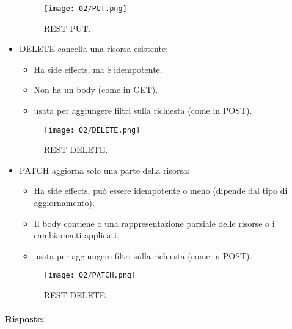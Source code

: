 \begin{itemize}
\begin{itemize}
	      \end{itemize}

	      \begin{figure}[h]
		      \centering
		      \texttt{[image: 02/PUT.png]}
		      \caption{REST PUT.}
	      \end{figure}

	\item DELETE cancella una risorsa esistente:
	      \begin{itemize}
		      \item Ha side effects, ma è idempotente.
		      \item Non ha un body (come in GET).
		      \item {} usata per aggiungere filtri sulla richiesta (come in POST).

	      \end{itemize}
	       \begin{figure}[h]
		      \centering
		      \texttt{[image: 02/DELETE.png]}
		\caption{REST DELETE.}
	      \end{figure}


	\item PATCH aggiorna solo una parte della risorsa:
	      \begin{itemize}
		      \item Ha side effects, può essere idempotente o meno (dipende dal tipo di aggiornamento).
		      \item Il body contiene o una rappresentazione parziale delle risorse o i cambiamenti applicati.
		      \item {} usata per aggiungere filtri sulla richiesta (come in POST).

	      \end{itemize}
	       \begin{figure}[h]
		      \centering
		      \texttt{[image: 02/PATCH.png]}
		\caption{REST DELETE.}
	\end{figure}
\end{itemize}


\paragraph{Risposte:}

